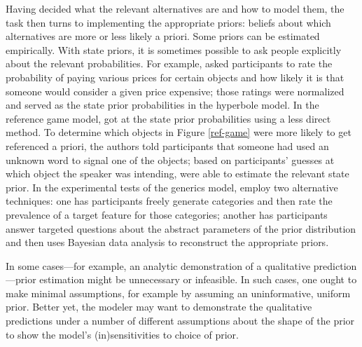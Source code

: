 \documentclass[10pt,letterpaper]{article}
\newcommand{\gcs}[1]{\textcolor{blue}{[gcs: #1]}}
\newcommand{\mf}[1]{\textcolor{orange}{[mf: #1]}}
\newcommand{\mht}[1]{\textcolor{purple}{[mht: #1]}}
\begin{document}
Having decided what the relevant alternatives are and how to model them, the task then turns to implementing the appropriate priors: beliefs about which alternatives are more or less likely a priori. Some priors can be estimated empirically. With state priors, it is sometimes possible to ask people explicitly about the relevant probabilities. For example, \cite{kaoetal2014} asked participants to rate the probability of paying various prices for certain objects and how likely it is that someone would consider a given price expensive; those ratings were normalized and served as the state prior probabilities in the hyperbole model. In the reference game model, \cite{frankgoodman2012} got at the state prior probabilities using a less direct method. To determine which objects in Figure \ref{ref-game} were more likely to get referenced a priori, the authors told participants that someone had used an unknown word to signal one of the objects; based on participants' guesses at which object the speaker was intending, \cite{frankgoodman2012} were able to estimate the relevant state prior.
In the experimental tests of the generics model, \cite{tesslergoodman2019} employ two alternative techniques: one has participants freely generate categories and then rate the prevalence of a target feature for those categories; another has participants answer targeted questions about the abstract parameters of the prior distribution and then uses Bayesian data analysis to reconstruct the appropriate priors. %


In some cases---for example, an analytic demonstration of a qualitative prediction---prior estimation might be unnecessary or infeasible. In such cases, one ought to make minimal assumptions, for example by assuming an uninformative, uniform prior. Better yet, the modeler may want to demonstrate the qualitative predictions under a number of different assumptions about the shape of the prior to show the model's (in)sensitivities to choice of prior.

\end{document}
